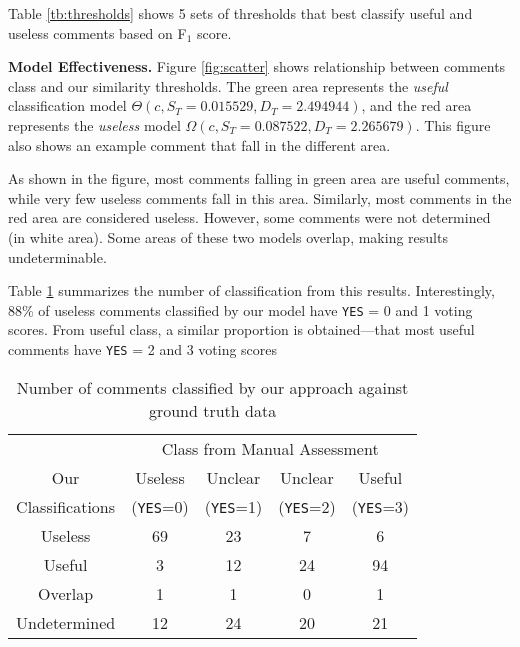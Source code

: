 Table \ref{tb:thresholds} shows 5 sets of thresholds that best classify useful and useless comments based on F$_1$ score.

\textbf{Model Effectiveness.}
Figure \ref{fig:scatter} shows relationship between comments class and our similarity thresholds.
The green area represents the \emph{useful} classification model $\Theta(c,S_T=0.015529,D_T=2.494944)$, and the red area represents the \emph{useless} model $\Omega(c,S_T=0.087522,D_T=2.265679)$.
This figure also shows an example comment that fall in the different area.

As shown in the figure, most comments falling in green area are useful comments, while very few useless comments fall in this area.
Similarly, most comments in the red area are considered useless.
However, some comments were not determined (in white area).
Some areas of these two models overlap, making results undeterminable.

Table \ref{tb:classify_number} summarizes the number of classification from this results.
Interestingly, 88\% of useless comments classified by our model have \texttt{YES} = 0 and 1 voting scores.
From useful class, a similar proportion is obtained---that most useful comments have \texttt{YES} = 2 and 3 voting scores


\begin{table}[h]
\centering
\small
\caption{Number of comments classified by our approach against ground truth data}
\begin{tabular}{ccccc}
\hline
& \multicolumn{4}{c}{Class from Manual Assessment} \\ \cline{2-5}
Our&  Useless  & Unclear  & Unclear & Useful \\
Classifications&  (\texttt{YES}=0) & (\texttt{YES}=1) & (\texttt{YES}=2) & (\texttt{YES}=3) \\
\hline \hline
Useless & 69 & 23 & 7 & 6 \\
Useful & 3 & 12 & 24 & 94 \\
Overlap & 1 & 1 & 0 & 1 \\
Undetermined & 12 & 24 & 20 & 21 \\
\hline
\end{tabular}
\label{tb:classify_number}
\end{table}


